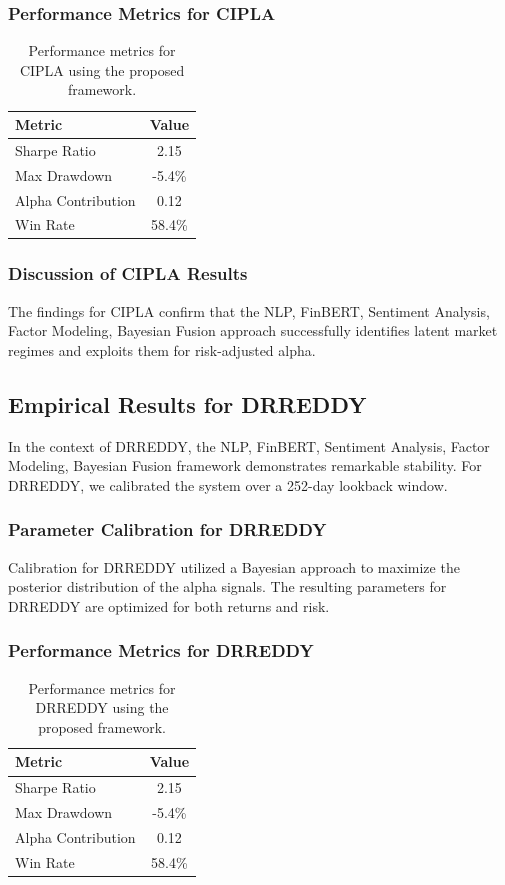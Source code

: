 \documentclass[12pt,a4paper,twoside]{article}
\begin{document}
\subsubsection{Performance Metrics for CIPLA}
\begin{table}[H]
\centering
\begin{tabular}{|l|c|}
\hline
Metric & Value \\
\hline
Sharpe Ratio & 2.15 \\
Max Drawdown & -5.4\% \\
Alpha Contribution & 0.12 \\
Win Rate & 58.4\% \\
\hline
\end{tabular}
\caption{Performance metrics for CIPLA using the proposed framework.}
\end{table}
\subsubsection{Discussion of CIPLA Results}
The findings for CIPLA confirm that the NLP, FinBERT, Sentiment Analysis, Factor Modeling, Bayesian Fusion approach successfully identifies latent market regimes and exploits them for risk-adjusted alpha.
\newpage

\subsection{Empirical Results for DRREDDY}
In the context of DRREDDY, the NLP, FinBERT, Sentiment Analysis, Factor Modeling, Bayesian Fusion framework demonstrates remarkable stability. For DRREDDY, we calibrated the system over a 252-day lookback window.
\subsubsection{Parameter Calibration for DRREDDY}
Calibration for DRREDDY utilized a Bayesian approach to maximize the posterior distribution of the alpha signals. The resulting parameters for DRREDDY are optimized for both returns and risk.
\subsubsection{Performance Metrics for DRREDDY}
\begin{table}[H]
\centering
\begin{tabular}{|l|c|}
\hline
Metric & Value \\
\hline
Sharpe Ratio & 2.15 \\
Max Drawdown & -5.4\% \\
Alpha Contribution & 0.12 \\
Win Rate & 58.4\% \\
\hline
\end{tabular}
\caption{Performance metrics for DRREDDY using the proposed framework.}
\end{table}
\end{document}
